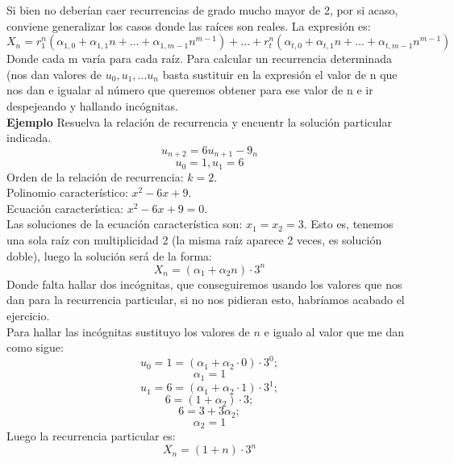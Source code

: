 \documentclass[a4paper]{article}
\begin{document}
Si bien no deberían caer recurrencias de grado mucho mayor de 2, por si acaso, conviene generalizar los casos donde las raíces son reales. La expresión es:
$$X_n=r_1^n(\alpha_{1,0}+\alpha_{1,1}n+...+\alpha_{1,m-1}n^{m-1})+...+r_t^n(\alpha_{t,0}+\alpha_{t,1}n+...+\alpha_{t,m-1}n^{m-1})$$
Donde cada m varía para cada raíz.
Para calcular un recurrencia determinada (nos dan valores de $u_0, u_1,...u_n$ basta sustituir en la expresión el valor de n que nos dan e igualar al número que queremos obtener para ese valor de n e ir despejeando y hallando incógnitas.\\
\large{\textbf{Ejemplo}}
Resuelva la relación de recurrencia y encuentr la solución particular indicada.
$$u_{n+2}=6u_{n+1}-9_n$$
$$u_0=1, u_1=6$$
Orden de la relación de recurrencia: $k=2$.\\
Polinomio característico: $x^2-6x+9$.\\
Ecuación característica: $x^2-6x+9=0$.\\
Las soluciones de la ecuación característica son: $x_1=x_2=3$. Esto es, tenemos una sola raíz con multiplicidad 2 (la misma raíz aparece 2 veces, es solución doble), luego la solución será de la forma:
$$X_n=(\alpha_1+\alpha_2n)\cdot 3^n$$
Donde falta hallar dos incógnitas, que conseguiremos usando los valores que nos dan para la recurrencia particular, si no nos pidieran esto, habríamos acabado el ejercicio.\\
Para hallar las incógnitas sustituyo los valores de $n$ e igualo al valor que me dan como sigue:
$$u_0=1=(\alpha_1+\alpha_2\cdot 0)\cdot 3^0;$$
$$\alpha_1=1$$
$$u_1=6=(\alpha_1+\alpha_2\cdot 1)\cdot 3^1;$$
$$6=(1+\alpha_2)\cdot 3;$$
$$6=3+3\alpha_2;$$
$$\alpha_2=1$$
Luego la recurrencia particular es:
$$X_n=(1+n)\cdot 3^n$$
\end{document}
